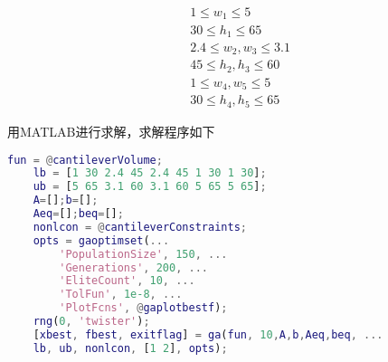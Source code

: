     \begin{align*}
    & 1\leqslant w_1\leqslant 5\\
    & 30\leqslant h_1\leqslant 65\\
    & 2.4\leqslant w_2,w_3\leqslant 3.1\\
    & 45\leqslant h_2,h_3\leqslant 60\\
    & 1\leqslant w_4,w_5\leqslant 5\\
    & 30\leqslant h_4,h_5\leqslant 65
    \end{align*}
    \par
    用MATLAB进行求解，求解程序如下
    \begin{lstlisting}[language = Matlab]
    fun = @cantileverVolume;
    lb = [1 30 2.4 45 2.4 45 1 30 1 30];
    ub = [5 65 3.1 60 3.1 60 5 65 5 65];
    A=[];b=[];
    Aeq=[];beq=[];
    nonlcon = @cantileverConstraints;
    opts = gaoptimset(...
        'PopulationSize', 150, ...
        'Generations', 200, ...
        'EliteCount', 10, ...
        'TolFun', 1e-8, ...
        'PlotFcns', @gaplotbestf);
    rng(0, 'twister');
    [xbest, fbest, exitflag] = ga(fun, 10,A,b,Aeq,beq, ...
    lb, ub, nonlcon, [1 2], opts);
    \end{lstlisting}


